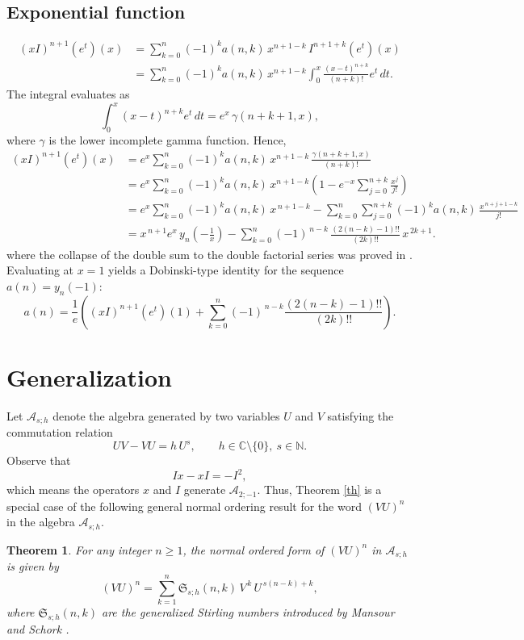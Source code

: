 \documentclass[12pt,reqno]{article}
\theoremstyle{plain}
\newtheorem{theorem}{Theorem}[section]
\theoremstyle{definition}
\theoremstyle{remark}
\begin{document}
\subsection{Exponential function}
\begin{align*}
(xI)^{n+1}(e^t)(x)
&=\sum_{k=0}^{n} (-1)^k a(n,k)\,
   x^{n+1-k}\,I^{n+1+k}(e^t)(x)\\
&= \sum_{k=0}^{n} (-1)^k a(n,k)\,
   x^{n+1-k} \int_0^x\frac{(x-t)^{n+k}}{(n+k)!}e^t\,dt.
\end{align*}
The integral evaluates as
\[
\int_0^x (x-t)^{n+k} e^t\,dt = e^x \, \gamma(n+k+1,x),
\]
where \(\gamma\) is the lower incomplete gamma function. Hence,
\begin{align*}
(xI)^{n+1}(e^t)(x)
&= e^x \sum_{k=0}^{n} (-1)^k a(n,k)\, x^{n+1-k} \,\frac{\gamma(n+k+1,x)}{(n+k)!}  \\
&= e^x \sum_{k=0}^{n} (-1)^k a(n,k)\, x^{n+1-k} 
   \left(1 - e^{-x}\sum_{j=0}^{n+k} \frac{x^j}{j!}\right) \\
&= e^x \sum_{k=0}^{n} (-1)^k a(n,k)\, x^{\,n+1-k}
   - \sum_{k=0}^{n}\sum_{j=0}^{n+k} (-1)^k a(n,k)\,\frac{x^{\,n+j+1-k}}{j!}\\
&= x^{\,n+1} e^{x}\,
y_n\!\left(-\frac1x\right)
-
\sum_{k=0}^{n}
(-1)^{\,n-k}\,
\frac{(2(n-k)-1)!!}{(2k)!!}\,
x^{\,2k+1}.  
\end{align*}
where the collapse of the double sum to the double factorial series was proved in \cite{RosengrenMO}. Evaluating at $x=1$ yields a Dobinski-type identity for the sequence
$a(n)=
y_n(-1)$:
\begin{equation}
a(n)
=
\frac1e\left(
 (xI)^{n+1}(e^t)(1)
+
\sum_{k=0}^{n}
(-1)^{\,n-k}\frac{(2(n-k)-1)!!}{(2k)!!}
\right).
\end{equation}
\section{Generalization}
Let $\mathscr{A}_{s;h}$ denote the algebra generated by two variables $U$ and $V$ satisfying the commutation relation
\[
UV - VU = h\,U^s,
\qquad h \in \mathbb{C} \setminus \{0\},\ s \in \mathbb{N}.
\]
Observe that 
\[
Ix - xI = -I^2,
\]  
which means the operators $x$ and $I$ generate $\mathscr{A}_{2;-1}$. Thus, Theorem \ref{th} is a special case of the following general normal ordering result for the word $(VU)^n$ in the algebra $\mathscr{A}_{s;h}$.

\begin{theorem}
For any integer $n \ge 1$, the normal ordered form of $(VU)^n$ in $\mathscr{A}_{s;h}$ is given by
\begin{equation}
(VU)^n
  = \sum_{k=1}^n \mathfrak{S}_{s;h}(n,k)\,
      V^{\,k}\, U^{\,s(n-k)+k},
\end{equation}
where $\mathfrak{S}_{s;h}(n,k)$ are the generalized Stirling numbers introduced by Mansour and Schork \cite{MSS}.    
\end{theorem}
\end{document}
